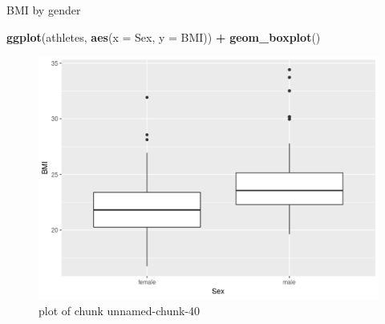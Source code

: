 \documentclass[ignorenonframetext,]{beamer}
\newenvironment{Shaded}{\begin{snugshade}}{\end{snugshade}}
\newcommand{\DataTypeTok}[1]{\textcolor[rgb]{0.13,0.29,0.53}{#1}}
\newcommand{\KeywordTok}[1]{\textcolor[rgb]{0.13,0.29,0.53}{\textbf{#1}}}
\newcommand{\NormalTok}[1]{#1}
\newcommand{\OperatorTok}[1]{\textcolor[rgb]{0.81,0.36,0.00}{\textbf{#1}}}
\newcommand{\StringTok}[1]{\textcolor[rgb]{0.31,0.60,0.02}{#1}}
\begin{document}
\begin{frame}[fragile]{BMI by gender}
\protect\hypertarget{bmi-by-gender}{}

\begin{Shaded}
\begin{Highlighting}[]
\KeywordTok{ggplot}\NormalTok{(athletes, }\KeywordTok{aes}\NormalTok{(}\DataTypeTok{x =}\NormalTok{ Sex, }\DataTypeTok{y =}\NormalTok{ BMI)) }\OperatorTok{+}\StringTok{ }\KeywordTok{geom_boxplot}\NormalTok{()}
\end{Highlighting}
\end{Shaded}

\begin{figure}
\centering
\includegraphics{figure/unnamed-chunk-40-1.png}
\caption{plot of chunk unnamed-chunk-40}
\end{figure}

\end{frame}
\end{document}
